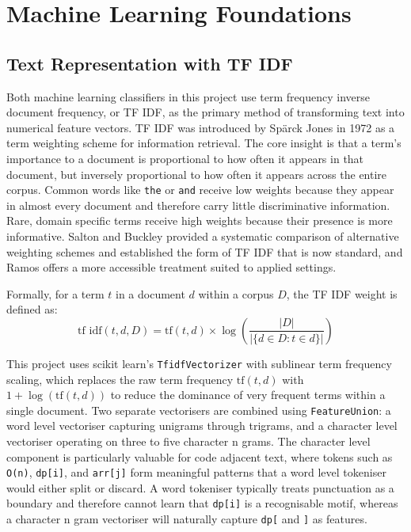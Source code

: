 \section{Machine Learning Foundations}

\subsection{Text Representation with TF IDF}

Both machine learning classifiers in this project use term frequency
inverse document frequency, or TF IDF, as the primary method of
transforming text into numerical feature vectors. TF IDF was introduced
by Sp\"{a}rck Jones \cite{sparck1972} in 1972 as a term weighting scheme
for information retrieval. The core insight is that a term's importance
to a document is proportional to how often it appears in that document,
but inversely proportional to how often it appears across the entire
corpus. Common words like \texttt{the} or \texttt{and} receive low
weights because they appear in almost every document and therefore carry
little discriminative information. Rare, domain specific terms receive
high weights because their presence is more informative. Salton and
Buckley \cite{salton1988tfidf} provided a systematic comparison of
alternative weighting schemes and established the form of TF IDF that is
now standard, and Ramos \cite{ramos2003tfidf} offers a more accessible
treatment suited to applied settings.

Formally, for a term $t$ in a document $d$ within a corpus $D$, the
TF IDF weight is defined as:
\[
\text{tf idf}(t, d, D) = \text{tf}(t, d) \times \log \left( \frac{|D|}{|\{d \in D : t \in d\}|} \right)
\]

This project uses scikit learn's \texttt{TfidfVectorizer}
\cite{pedregosa2011} with sublinear term frequency scaling, which
replaces the raw term frequency $\text{tf}(t, d)$ with $1 + \log(\text{tf}(t, d))$
to reduce the dominance of very frequent terms within a single document.
Two separate vectorisers are combined using \texttt{FeatureUnion}: a word
level vectoriser capturing unigrams through trigrams, and a character
level vectoriser operating on three to five character n grams. The
character level component is particularly valuable for code adjacent
text, where tokens such as \texttt{O(n)}, \texttt{dp[i]}, and
\texttt{arr[j]} form meaningful patterns that a word level tokeniser
would either split or discard. A word tokeniser typically treats
punctuation as a boundary and therefore cannot learn that \texttt{dp[i]}
is a recognisable motif, whereas a character n gram vectoriser will
naturally capture \texttt{dp[} and \texttt{]} as features.

